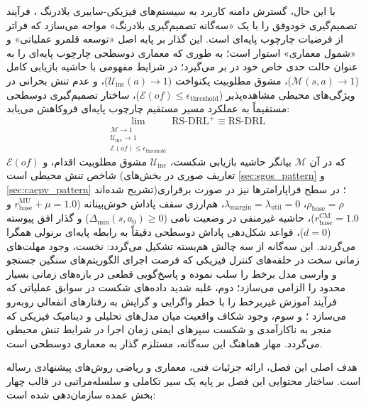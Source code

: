 \documentclass[oneside,openany,phd]{TMU-Thesis}
\begin{document}
با این حال، گسترش دامنه کاربرد به سیستم‌های فیزیکی-سایبری بلادرنگ \cite{muccini2016self}، فرآیند تصمیم‌گیری خودوفق را با یک «سه‌گانه تصمیم‌گیری بلادرنگ» مواجه می‌سازد که فراتر از فرضیات چارچوب پایه‌ای است. این گذار بر پایه اصل «توسعه قلمرو عملیاتی» و «شمول معماری» استوار است؛ به طوری که معماری دوسطحی \rsdrlplus چارچوب پایه‌ای  را به عنوان حالت حدی خاص خود در بر می‌گیرد؛ در شرایط مفهومی با حاشیه بازیابی کامل ($\mathcal{M}(s, a) \to 1$)، مشوق مطلوبیت یکنواخت ($\mathcal{U}_{\text{inc}}(a) \to 1$)، و عدم تنش بحرانی در ویژگی‌های محیطی مشاهده‌پذیر ($\mathcal{E}(of) \le \epsilon_{\text{threshold}}$)، ساختار تصمیم‌گیری دوسطحی مستقیماً به عملکرد مسیر مستقیم چارچوب پایه‌ای فروکاهش می‌یابد:
\begin{equation}
\label{eq:subsumption_limit}
\lim_{\substack{\mathcal{M} \to 1 \\ \mathcal{U}_{\text{inc}} \to 1 \\ \mathcal{E}(of) \le \epsilon_{\text{threshold}}}} \text{RS-DRL}^+ \equiv \text{RS-DRL}
\end{equation}
که در آن $\mathcal{M}$ بیانگر حاشیه بازیابی شکست، $\mathcal{U}_{\text{inc}}$ مشوق مطلوبیت اقدام، و $\mathcal{E}(of)$ شاخص تنش محیطی است (تعاریف صوری در بخش‌های \ref{sec:sgos_pattern} و \ref{sec:caepv_pattern} تشریح شده‌اند)؛ در سطح فراپارامترها نیز در صورت برقراری $\rho_{\text{base}} = \rho$، $\lambda_{\text{margin}} = \lambda_{\text{util}} = 0$، هم‌ارزی سقف پاداش خوش‌بینانه ($r_{\text{base}}^{\text{MU}} + \mu = 1.0$ و $r_{\text{base}}^{\text{CM}} = 1.0$)، حاشیه غیرمنفی در وضعیت نامی ($\Delta_{\min}(s, a_0) \ge 0$) و گذار افق پیوسته ($d = 0$)، قواعد شکل‌دهی پاداش دوسطحی دقیقاً به رابطه پایه‌ای برنولی همگرا می‌گردند.
این سه‌گانه از سه چالش هم‌بسته تشکیل می‌گردد: نخست، وجود مهلت‌های زمانی سخت در حلقه‌های کنترل فیزیکی که فرصت اجرای الگوریتم‌های سنگین جستجو و وارسی مدل برخط را سلب نموده و پاسخ‌گویی قطعی در بازه‌های زمانی بسیار محدود را الزامی می‌سازد؛ دوم، غلبه شدید داده‌های شکست در سوابق عملیاتی که فرآیند آموزش غیربرخط را با خطر واگرایی و گرایش به رفتارهای انفعالی روبه‌رو می‌سازد \cite{andrychowicz2017her}؛ و سوم، وجود شکاف واقعیت میان مدل‌های تحلیلی و دینامیک فیزیکی که منجر به ناکارآمدی و شکست سپرهای ایمنی زمان اجرا \cite{alshiekh2018safe} در شرایط تنش محیطی می‌گردد. مهار هماهنگ این سه‌گانه، مستلزم گذار به معماری دوسطحی \rsdrlplus است.

هدف اصلی این فصل، ارائه جزئیات فنی، معماری و ریاضی روش‌های پیشنهادی رساله است. ساختار محتوایی این فصل بر پایه یک سیر تکاملی و سلسله‌مراتبی در قالب چهار بخش عمده سازمان‌دهی شده است:
\end{document}
